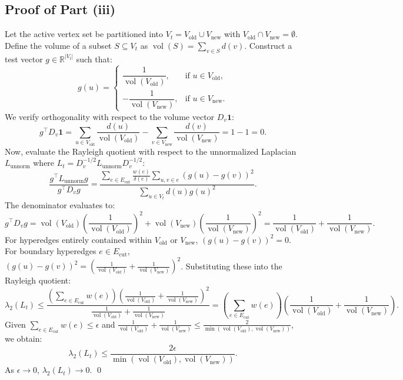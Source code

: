 \documentclass[11pt]{article}
\DeclareMathOperator{\vol}{vol}
\newcommand{\R}{\mathbb{R}}
\begin{document}
\subsection{Proof of Part (iii)}
Let the active vertex set be partitioned into $V_t = V_{\text{old}} \cup V_{\text{new}}$ with $V_{\text{old}} \cap V_{\text{new}} = \emptyset$.
Define the volume of a subset $S \subseteq V_t$ as $\vol(S) = \sum_{v \in S} d(v)$.
Construct a test vector $g \in \R^{|V_t|}$ such that:
\begin{equation}
  g(u) = \begin{cases}
    \dfrac{1}{\vol(V_{\text{old}})}, & \text{if } u \in V_{\text{old}}, \\[8pt]
    -\dfrac{1}{\vol(V_{\text{new}})}, & \text{if } u \in V_{\text{new}}.
  \end{cases}
\end{equation}
We verify orthogonality with respect to the volume vector $D_v \mathbf{1}$:
\begin{equation}
  g^\top D_v \mathbf{1} = \sum_{u \in V_{\text{old}}} \frac{d(u)}{\vol(V_{\text{old}})} - \sum_{v \in V_{\text{new}}} \frac{d(v)}{\vol(V_{\text{new}})} = 1 - 1 = 0.
\end{equation}
Now, evaluate the Rayleigh quotient with respect to the unnormalized Laplacian $L_{\text{unnorm}}$ where $L_t = D_v^{-1/2} L_{\text{unnorm}} D_v^{-1/2}$:
\begin{equation}
  \frac{g^\top L_{\text{unnorm}} g}{g^\top D_v g} = \frac{\displaystyle\sum_{e \in E_{\text{cut}}} \frac{w(e)}{\delta(e)} \sum_{u, v \in e} (g(u) - g(v))^2}{\displaystyle\sum_{u \in V_t} d(u) g(u)^2}.
\end{equation}
The denominator evaluates to:
\begin{equation}
  g^\top D_v g = \vol(V_{\text{old}}) \left( \frac{1}{\vol(V_{\text{old}})} \right)^2 + \vol(V_{\text{new}}) \left( \frac{1}{\vol(V_{\text{new}})} \right)^2 = \frac{1}{\vol(V_{\text{old}})} + \frac{1}{\vol(V_{\text{new}})}.
\end{equation}
For hyperedges entirely contained within $V_{\text{old}}$ or $V_{\text{new}}$, $(g(u) - g(v))^2 = 0$. For boundary hyperedges $e \in E_{\text{cut}}$, $(g(u) - g(v))^2 = \left( \frac{1}{\vol(V_{\text{old}})} + \frac{1}{\vol(V_{\text{new}})} \right)^2$.
Substituting these into the Rayleigh quotient:
\begin{equation}
  \lambda_2(L_t) \le \frac{\left(\sum_{e \in E_{\text{cut}}} w(e)\right) \left( \frac{1}{\vol(V_{\text{old}})} + \frac{1}{\vol(V_{\text{new}})} \right)^2}{\frac{1}{\vol(V_{\text{old}})} + \frac{1}{\vol(V_{\text{new}})}} = \left(\sum_{e \in E_{\text{cut}}} w(e)\right) \left( \frac{1}{\vol(V_{\text{old}})} + \frac{1}{\vol(V_{\text{new}})} \right).
\end{equation}
Given $\sum_{e \in E_{\text{cut}}} w(e) \le \epsilon$ and $\frac{1}{\vol(V_{\text{old}})} + \frac{1}{\vol(V_{\text{new}})} \le \frac{2}{\min(\vol(V_{\text{old}}), \vol(V_{\text{new}}))}$, we obtain:
\begin{equation}
  \lambda_2(L_t) \le \frac{2 \epsilon}{\min(\vol(V_{\text{old}}), \vol(V_{\text{new}}))}.
\end{equation}
As $\epsilon \to 0$, $\lambda_2(L_t) \to 0$. \qed
\end{document}
